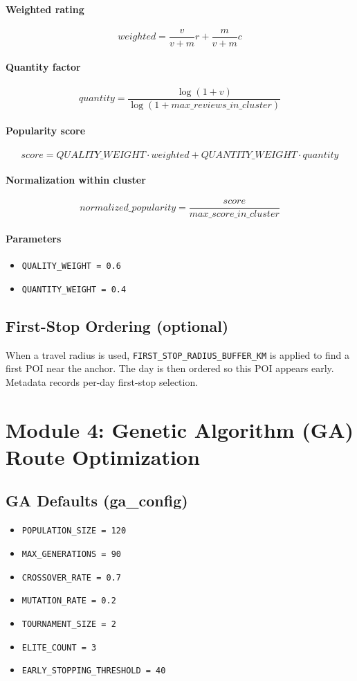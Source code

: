 \documentclass[11pt]{article}
\begin{document}
\paragraph{Weighted rating}
\[
weighted = \frac{v}{v + m} r + \frac{m}{v + m} c
\]

\paragraph{Quantity factor}
\[
quantity = \frac{\log(1 + v)}{\log(1 + max\_reviews\_in\_cluster)}
\]

\paragraph{Popularity score}
\[
score = QUALITY\_WEIGHT \cdot weighted + QUANTITY\_WEIGHT \cdot quantity
\]

\paragraph{Normalization within cluster}
\[
normalized\_popularity = \frac{score}{max\_score\_in\_cluster}
\]

\paragraph{Parameters}
\begin{itemize}
  \item \texttt{QUALITY\_WEIGHT = 0.6}
  \item \texttt{QUANTITY\_WEIGHT = 0.4}
\end{itemize}

\subsection{First-Stop Ordering (optional)}
When a travel radius is used, \texttt{FIRST\_STOP\_RADIUS\_BUFFER\_KM} is applied to find a first POI near the anchor. The day is then ordered so this POI appears early. Metadata records per-day first-stop selection.

\section{Module 4: Genetic Algorithm (GA) Route Optimization}

\subsection{GA Defaults (ga\_config)}
\begin{itemize}
  \item \texttt{POPULATION\_SIZE = 120}
  \item \texttt{MAX\_GENERATIONS = 90}
  \item \texttt{CROSSOVER\_RATE = 0.7}
  \item \texttt{MUTATION\_RATE = 0.2}
  \item \texttt{TOURNAMENT\_SIZE = 2}
  \item \texttt{ELITE\_COUNT = 3}
  \item \texttt{EARLY\_STOPPING\_THRESHOLD = 40}
\end{itemize}
\end{document}
